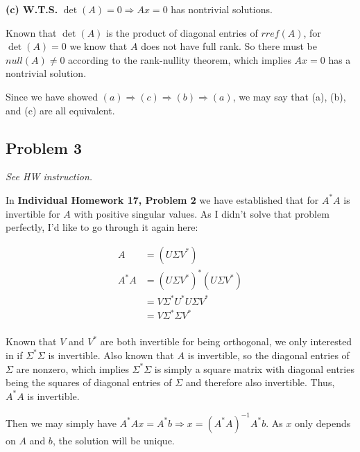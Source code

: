 \documentclass[11pt]{article}
\begin{document}
\noindent\textbf{(c) W.T.S.} $\det(A) = 0 \Longrightarrow Ax = 0$ has nontrivial solutions.

Known that $\det(A)$ is the product of diagonal entries of $rref(A)$, for $\det(A) = 0$ we know that $A$ does not have full rank. So there must be $null(A) \neq 0$ according to the rank-nullity theorem, which implies $Ax = 0$ has a nontrivial solution.\newline


Since we have showed $(a) \Rightarrow (c) \Rightarrow (b) \Rightarrow (a)$, we may say that (a), (b), and (c) are all equivalent.


\subsection*{Problem 3}
\textit{See HW instruction.}\newline

In \textbf{Individual Homework 17, Problem 2} we have established that for $A^* A$ is invertible for $A$ with positive singular values. As I didn't solve that problem perfectly, I'd like to go through it again here:

\begin{align*}
    A &= (U \Sigma V^*) \\
    A^* A &= (U \Sigma V^*)^* (U \Sigma V^*) \\
    &= V \Sigma^* U^* U \Sigma V^* \\
    &= V \Sigma^* \Sigma V^* \\
\end{align*}

Known that $V$ and $V^*$ are both invertible for being orthogonal, we only interested in if $\Sigma^* \Sigma$ is invertible. Also known that $A$ is invertible, so the diagonal entries of $\Sigma$ are nonzero, which implies $\Sigma^* \Sigma$ is simply a square matrix with diagonal entries being the squares of diagonal entries of $\Sigma$ and therefore also invertible. Thus, $A^* A$ is invertible.\newline

Then we may simply have $A^* Ax = A^* b \Longrightarrow x = (A^* A)^{-1} A^* b$. As $x$ only depends on $A$ and $b$, the solution will be unique.\newline
\end{document}
